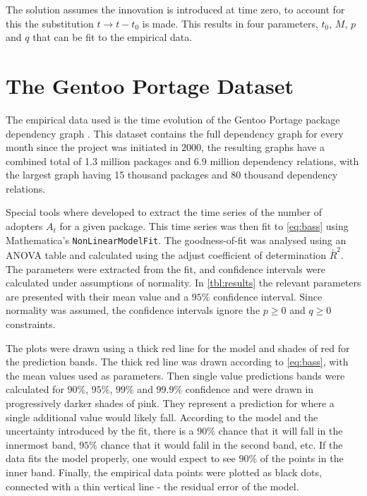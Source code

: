 \documentclass[smallextended,final]{svjour3}
\begin{document}
The solution assumes the innovation is introduced at time zero, to account for this the substitution $t \rightarrow t - t_0$ is made. This results in four parameters, $t_0$, $M$, $p$ and $q$ that can be fit to the empirical data.




\section{The Gentoo Portage Dataset}

The empirical data used is the time evolution of the Gentoo Portage package dependency graph \citep{rem14}. This dataset contains the full dependency graph for every month since the project was initiated in $2000$, the resulting graphs have a combined total of 1.3 million packages and 6.9 million dependency relations, with the largest graph having 15 thousand packages and 80 thousand dependency relations.

Special tools where developed to extract the time series of the number of adopters $A_t$ for a given package. This time series was then fit to \eqref{eq:bass} using Mathematica's \texttt{NonLinearModelFit}. The goodness-of-fit was analysed using an ANOVA table and calculated using the adjust coefficient of determination $\bar{R}^2$. The parameters were extracted from the fit, and confidence intervals were calculated under assumptions of normality. In \ref{tbl:results} the relevant parameters are presented with their mean value and a $95\%$ confidence interval. Since normality was assumed, the confidence intervals ignore the $p \ge 0$ and $q \ge 0$ constraints. 

The plots were drawn using a thick red line for the model and shades of red for the prediction bands. The thick red line was drawn according to \eqref{eq:bass}, with the mean values used as parameters. Then single value predictions bands were calculated for $90\%$, $95\%$, $99\%$ and $99.9\%$ confidence and were drawn in progressively darker shades of pink. They represent a prediction for where a single additional value would likely fall. According to the model and the uncertainty introduced by the fit, there is a $90\%$ chance that it will fall in the innermost band, $95\%$ chance that it would falil in the second band, etc. If the data fits the model properly, one would expect to see $90\%$ of the points in the inner band. Finally, the empirical data points were plotted as black dots, connected with a thin vertical line - the residual error of the model.
\end{document}
